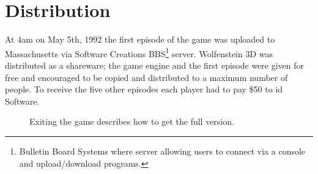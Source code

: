 \documentclass[book.tex]{subfiles}
\begin{document}
\section{Distribution}
At 4am on May 5th, 1992 the first episode of the game was uploaded to Massachusetts via Software Creations BBS\footnote{Bulletin Board Systems where server allowing users to connect via a console and upload/download programs.} server. Wolfenstein 3D was distributed as a shareware; the game engine and the first episode were given for free and encouraged to be copied and distributed to a maximum number of people. To receive the five other episodes each player had to pay \$50 to id Software.\\
\par
\begin{figure}[H]
\centering
 \caption{Exiting the game describes how to get the full version.}
 \end{figure}
\end{document}
